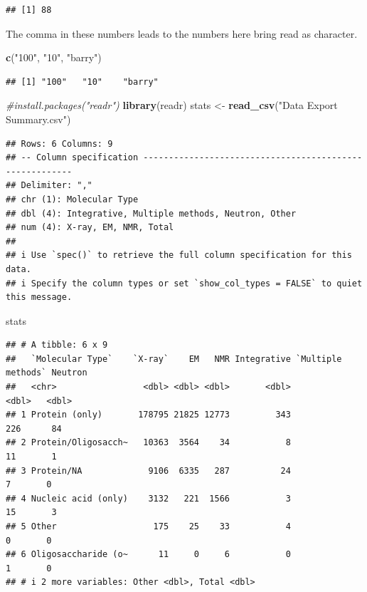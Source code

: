\documentclass[
]{article}
\newenvironment{Shaded}{\begin{snugshade}}{\end{snugshade}}
\newcommand{\CommentTok}[1]{\textcolor[rgb]{0.56,0.35,0.01}{\textit{#1}}}
\newcommand{\FunctionTok}[1]{\textcolor[rgb]{0.13,0.29,0.53}{\textbf{#1}}}
\newcommand{\NormalTok}[1]{#1}
\newcommand{\OtherTok}[1]{\textcolor[rgb]{0.56,0.35,0.01}{#1}}
\newcommand{\StringTok}[1]{\textcolor[rgb]{0.31,0.60,0.02}{#1}}
\begin{document}
\begin{verbatim}
## [1] 88
\end{verbatim}

The comma in these numbers leads to the numbers here bring read as
character.

\begin{Shaded}
\begin{Highlighting}[]
\FunctionTok{c}\NormalTok{(}\StringTok{"100"}\NormalTok{, }\StringTok{"10"}\NormalTok{, }\StringTok{"barry"}\NormalTok{)}
\end{Highlighting}
\end{Shaded}

\begin{verbatim}
## [1] "100"   "10"    "barry"
\end{verbatim}

\begin{Shaded}
\begin{Highlighting}[]
\CommentTok{\#install.packages("readr")}
\FunctionTok{library}\NormalTok{(readr)}
\NormalTok{stats }\OtherTok{\textless{}{-}} \FunctionTok{read\_csv}\NormalTok{(}\StringTok{"Data Export Summary.csv"}\NormalTok{)}
\end{Highlighting}
\end{Shaded}

\begin{verbatim}
## Rows: 6 Columns: 9
## -- Column specification --------------------------------------------------------
## Delimiter: ","
## chr (1): Molecular Type
## dbl (4): Integrative, Multiple methods, Neutron, Other
## num (4): X-ray, EM, NMR, Total
## 
## i Use `spec()` to retrieve the full column specification for this data.
## i Specify the column types or set `show_col_types = FALSE` to quiet this message.
\end{verbatim}

\begin{Shaded}
\begin{Highlighting}[]
\NormalTok{stats}
\end{Highlighting}
\end{Shaded}

\begin{verbatim}
## # A tibble: 6 x 9
##   `Molecular Type`    `X-ray`    EM   NMR Integrative `Multiple methods` Neutron
##   <chr>                 <dbl> <dbl> <dbl>       <dbl>              <dbl>   <dbl>
## 1 Protein (only)       178795 21825 12773         343                226      84
## 2 Protein/Oligosacch~   10363  3564    34           8                 11       1
## 3 Protein/NA             9106  6335   287          24                  7       0
## 4 Nucleic acid (only)    3132   221  1566           3                 15       3
## 5 Other                   175    25    33           4                  0       0
## 6 Oligosaccharide (o~      11     0     6           0                  1       0
## # i 2 more variables: Other <dbl>, Total <dbl>
\end{verbatim}
\end{document}

